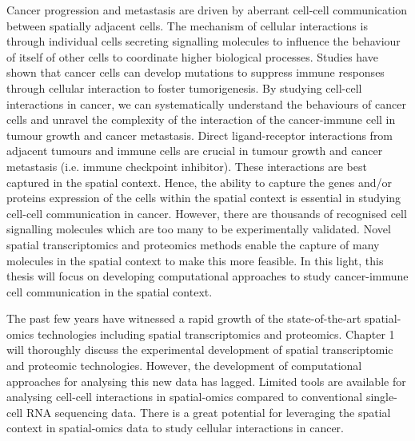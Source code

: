 

%

%





\noindent
Cancer progression and metastasis are driven by aberrant cell-cell communication between spatially adjacent cells. The mechanism of cellular interactions is through individual cells secreting signalling molecules to influence the behaviour of itself of other cells to coordinate higher biological processes. Studies have shown that cancer cells can develop mutations to suppress immune responses through cellular interaction to foster tumorigenesis. By studying cell-cell interactions in cancer, we can systematically understand the behaviours of cancer cells and unravel the complexity of the interaction of the cancer-immune cell in tumour growth and cancer metastasis. Direct ligand-receptor interactions from adjacent tumours and immune cells are crucial in tumour growth and cancer metastasis (i.e. immune checkpoint inhibitor). These interactions are best captured in the spatial context.  Hence, the ability to capture the genes and/or proteins expression of the cells within the spatial context is essential in studying cell-cell communication in cancer. However, there are thousands of recognised cell signalling molecules which are too many to be experimentally validated. Novel spatial transcriptomics and proteomics methods enable the capture of many molecules in the spatial context to make this more feasible. In this light, this thesis will focus on developing computational approaches to study cancer-immune cell communication in the spatial context.  

The past few years have witnessed a rapid growth of the state-of-the-art spatial-omics technologies including spatial transcriptomics and proteomics. Chapter 1 will thoroughly discuss the experimental development of spatial transcriptomic and proteomic technologies. However, the development of computational approaches for analysing this new data has lagged. Limited tools are available for analysing cell-cell interactions in spatial-omics compared to conventional single-cell RNA sequencing data. There is a great potential for leveraging the spatial context in spatial-omics data to study cellular interactions in cancer.

